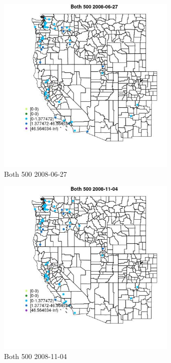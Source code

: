 \begin{figure} 
\centering  
\includegraphics[width=0.77\textwidth]{Code_Outputs/Report_ML_input_PM25_Step4_part_e_de_duplicated_aves_MapObsBoth_5002008-06-27.jpg} 
\caption{\label{fig:Report_ML_input_PM25_Step4_part_e_de_duplicated_avesMapObsBoth_5002008-06-27}Both 500 2008-06-27} 
\end{figure} 
 

\begin{figure} 
\centering  
\includegraphics[width=0.77\textwidth]{Code_Outputs/Report_ML_input_PM25_Step4_part_e_de_duplicated_aves_MapObsBoth_5002008-11-04.jpg} 
\caption{\label{fig:Report_ML_input_PM25_Step4_part_e_de_duplicated_avesMapObsBoth_5002008-11-04}Both 500 2008-11-04} 
\end{figure} 
 

